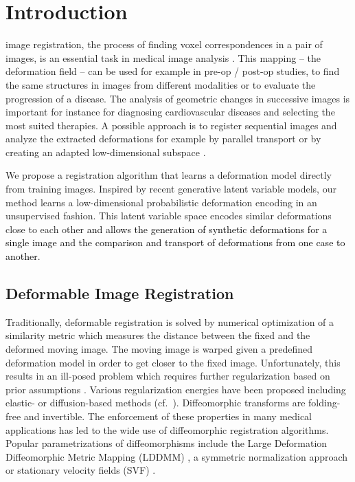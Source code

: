\documentclass[journal]{IEEEtran}
\newcommand{\update}[1]{\textcolor{black}{#1}}
\begin{document}
\section{Introduction}
 image registration, the process of finding voxel correspondences in a pair of images, is an essential task in medical image analysis \cite{sotiras}. This mapping -- the deformation field -- can be used for example in pre-op / post-op studies, to find the same structures in images from different modalities or to evaluate the progression of a disease. The analysis of geometric changes in successive images is important for instance for diagnosing cardiovascular diseases and selecting the most suited therapies. A possible approach is to register sequential images and analyze the extracted deformations for example by parallel transport \cite{lorenzi2014efficient} or by creating an adapted low-dimensional subspace \cite{rohe2018low}. 

We propose a registration algorithm that learns a deformation model directly from training images. Inspired by recent generative latent variable models, our method learns a low-dimensional probabilistic deformation encoding in an unsupervised fashion. This latent variable space encodes similar deformations close to each other \update{and allows the generation of synthetic deformations for a single image and the comparison and transport of deformations from one case to another}.

\subsection{Deformable Image Registration}
Traditionally, deformable registration is solved by numerical optimization of a similarity metric which measures the distance between the fixed and the deformed moving image. The moving image is warped given a predefined deformation model in order to get closer to the fixed image. Unfortunately, this results in an ill-posed problem which requires further regularization based on prior assumptions \cite{sotiras}. Various regularization energies have been proposed including elastic- \cite{davatzikos1997spatial,burger2013hyperelastic} or diffusion-based methods \cite{thirion1998image,vercauteren2007non,lorenzi2013lcc} (cf.~\cite{sotiras}).  Diffeomorphic transforms are folding-free and invertible. The enforcement of these properties in many medical applications has led to the wide use of diffeomorphic registration algorithms. Popular parametrizations of diffeomorphisms include the Large Deformation Diffeomorphic Metric Mapping (LDDMM) \update{\cite{beg2005computing,cao2005large,zhang2015finite}}, a symmetric normalization approach \cite{avants2008symmetric} or stationary velocity fields (SVF) \cite{arsigny2006log,vercauteren2008symmetric}.
\end{document}
